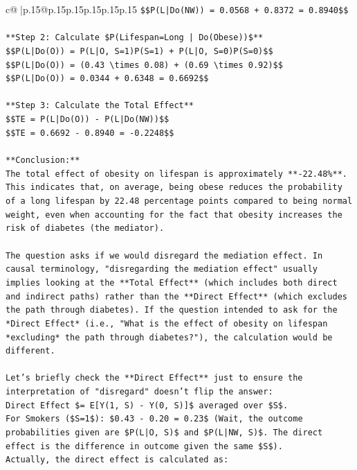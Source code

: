 \documentclass{article}
\begin{document}
{\begin{supertabular}{c@{$\;$}|p{.15\linewidth}@{}p{.15\linewidth}p{.15\linewidth}p{.15\linewidth}p{.15\linewidth}p{.15\linewidth}}
{{{\texttt{\$\$P(L|Do(NW)) = 0.0568 + 0.8372 = 0.8940\$\$} \\
\\ 
\texttt{**Step 2: Calculate \$P(Lifespan=Long | Do(Obese))\$**} \\
\texttt{\$\$P(L|Do(O)) = P(L|O, S=1)P(S=1) + P(L|O, S=0)P(S=0)\$\$} \\
\texttt{\$\$P(L|Do(O)) = (0.43 \textbackslash{}times 0.08) + (0.69 \textbackslash{}times 0.92)\$\$} \\
\texttt{\$\$P(L|Do(O)) = 0.0344 + 0.6348 = 0.6692\$\$} \\
\\ 
\texttt{**Step 3: Calculate the Total Effect**} \\
\texttt{\$\$TE = P(L|Do(O)) {-} P(L|Do(NW))\$\$} \\
\texttt{\$\$TE = 0.6692 {-} 0.8940 = {-}0.2248\$\$} \\
\\ 
\texttt{**Conclusion:**} \\
\texttt{The total effect of obesity on lifespan is approximately **{-}22.48\%**. This indicates that, on average, being obese reduces the probability of a long lifespan by 22.48 percentage points compared to being normal weight, even when accounting for the fact that obesity increases the risk of diabetes (the mediator).} \\
\\ 
\texttt{The question asks if we would disregard the mediation effect. In causal terminology, "disregarding the mediation effect" usually implies looking at the **Total Effect** (which includes both direct and indirect paths) rather than the **Direct Effect** (which excludes the path through diabetes). If the question intended to ask for the *Direct Effect* (i.e., "What is the effect of obesity on lifespan *excluding* the path through diabetes?"), the calculation would be different.} \\
\\ 
\texttt{Let's briefly check the **Direct Effect** just to ensure the interpretation of "disregard" doesn't flip the answer:} \\
\texttt{Direct Effect \$= E{[}Y(1, S) {-} Y(0, S){]}\$ averaged over \$S\$.} \\
\texttt{For Smokers (\$S=1\$): \$0.43 {-} 0.20 = 0.23\$ (Wait, the outcome probabilities given are \$P(L|O, S)\$ and \$P(L|NW, S)\$. The direct effect is the difference in outcome given the same \$S\$).} \\
\texttt{Actually, the direct effect is calculated as:} \\
}}}
\end{supertabular}}
\end{document}
